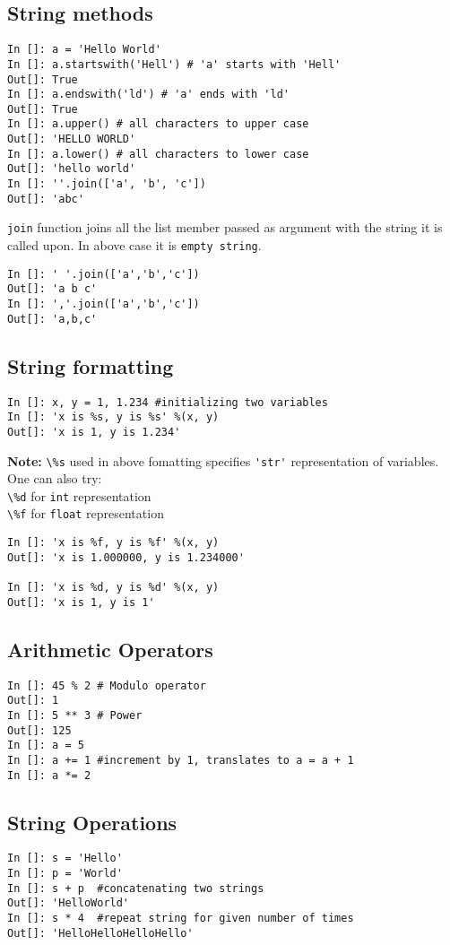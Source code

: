 \documentclass[12pt]{article}
\newcommand{\typ}[1]{\lstinline{#1}}
\begin{document}
\subsection{String methods}
  \begin{lstlisting}
In []: a = 'Hello World' 
In []: a.startswith('Hell') # 'a' starts with 'Hell'
Out[]: True
In []: a.endswith('ld') # 'a' ends with 'ld'
Out[]: True
In []: a.upper() # all characters to upper case
Out[]: 'HELLO WORLD'
In []: a.lower() # all characters to lower case
Out[]: 'hello world'
In []: ''.join(['a', 'b', 'c'])
Out[]: 'abc'
  \end{lstlisting}
\typ{join} function joins all the list member passed as argument with the string it is called upon. In above case it is \typ{empty string}.
\begin{lstlisting}
In []: ' '.join(['a','b','c'])
Out[]: 'a b c'  
In []: ','.join(['a','b','c'])
Out[]: 'a,b,c'
\end{lstlisting}
\subsection{String formatting}
  \begin{lstlisting}
In []: x, y = 1, 1.234 #initializing two variables
In []: 'x is %s, y is %s' %(x, y)
Out[]: 'x is 1, y is 1.234'
  \end{lstlisting}
\textbf{Note:} \typ{\%s} used in above fomatting specifies \typ{'str'} representation of variables. One can also try:\\
\typ{\%d} for \typ{int} representation\\
\typ{\%f} for \typ{float} representation
\begin{lstlisting}
In []: 'x is %f, y is %f' %(x, y)
Out[]: 'x is 1.000000, y is 1.234000'

In []: 'x is %d, y is %d' %(x, y)
Out[]: 'x is 1, y is 1'
\end{lstlisting}
\subsection{Arithmetic Operators}
  \begin{lstlisting}
In []: 45 % 2 # Modulo operator
Out[]: 1
In []: 5 ** 3 # Power
Out[]: 125
In []: a = 5
In []: a += 1 #increment by 1, translates to a = a + 1
In []: a *= 2
  \end{lstlisting}
\subsection{String Operations}
\begin{lstlisting}
In []: s = 'Hello'
In []: p = 'World'
In []: s + p  #concatenating two strings
Out[]: 'HelloWorld'
In []: s * 4  #repeat string for given number of times
Out[]: 'HelloHelloHelloHello'
\end{lstlisting}
\end{document}
